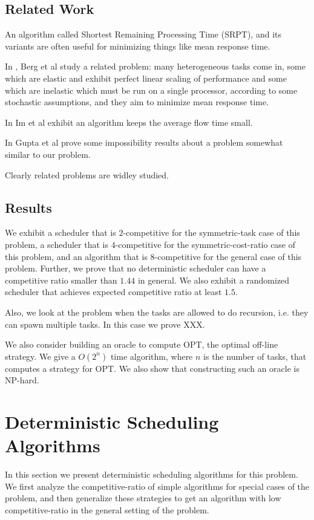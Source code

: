 \documentclass[twocolumn]{article}[10pt]
\begin{document}
\subsection{Related Work}
An algorithm called Shortest Remaining Processing Time (SRPT),
and its variants are often useful for minimizing things like mean
response time.

In \cite{bb20}, Berg et al study a related problem:
many heterogeneous tasks come in, some which are elastic and
exhibit perfect linear scaling of performance and some which are
inelastic which must be run on a single processor, according to
some stochastic assumptions, and they aim to minimize mean
response time.

In \cite{is16} Im et al exhibit an algorithm keeps the average
flow time small. 

In \cite{ga12} Gupta et al prove some impossibility results about
a problem somewhat similar to our problem.

Clearly related problems are widley studied.

\subsection{Results}
  We exhibit a scheduler that is $2$-competitive for the
  symmetric-task case of this problem, a scheduler that is
  $4$-competitive for the symmetric-cost-ratio case of this
  problem, and an algorithm that is $8$-competitive for the
  general case of this problem.
  Further, we prove that no deterministic scheduler can have a competitive
  ratio smaller than $1.44$ in general.
  We also exhibit a randomized scheduler that achieves
  expected competitive ratio at least $1.5$.

  Also, we look at the problem when the tasks are allowed to do
  recursion, i.e. they can spawn multiple tasks. In this case we
  prove XXX.

  We also consider building an oracle to compute OPT, the optimal
  off-line strategy. We give a $O(2^n)$ time algorithm, where $n$
  is the number of tasks, that computes a strategy for OPT. We
  also show that constructing such an oracle is NP-hard.


\section{Deterministic Scheduling Algorithms}

In this section we present deterministic scheduling algorithms
for this problem. We first analyze the competitive-ratio of
simple algorithms for special cases of the problem, and then
generalize these strategies to get an algorithm with low
competitive-ratio in the general setting of the problem.
\end{document}
